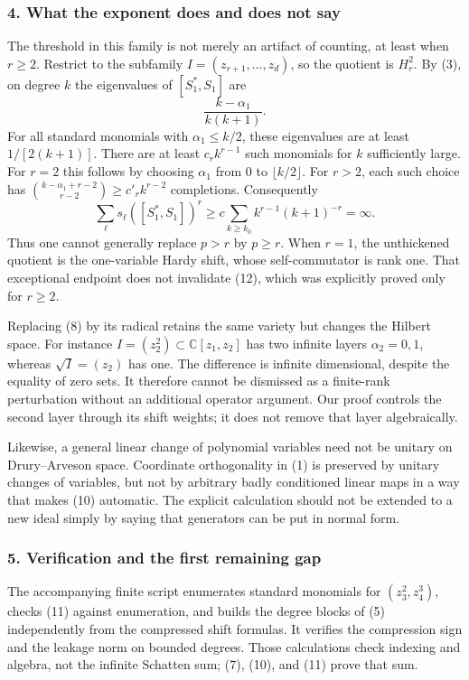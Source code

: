 \documentclass[11pt]{article}
\begin{document}
\subsubsection{4. What the exponent does and does not say}
The threshold in this family is not merely an artifact of counting, at least when $r\geq2$. Restrict to the subfamily $I=(z_{r+1},\ldots,z_d)$, so the quotient is $H_r^2$. By (3), on degree $k$ the eigenvalues of $[S_1^*,S_1]$ are
\[
 \frac{k-\alpha_1}{k(k+1)}.
\]
For all standard monomials with $\alpha_1\leq k/2$, these eigenvalues are at least $1/[2(k+1)]$. There are at least $c_r k^{r-1}$ such monomials for $k$ sufficiently large. For $r=2$ this follows by choosing $\alpha_1$ from $0$ to $\lfloor k/2\rfloor$. For $r>2$, each such choice has
${k-\alpha_1+r-2\choose r-2}\geq c'_r k^{r-2}$ completions. Consequently
\[
 \sum_\ell s_\ell([S_1^*,S_1])^r
 \geq c\sum_{k\geq k_0} k^{r-1}(k+1)^{-r}=\infty.         \tag{12}
\]
Thus one cannot generally replace $p>r$ by $p\geq r$. When $r=1$, the unthickened quotient is the one-variable Hardy shift, whose self-commutator is rank one. That exceptional endpoint does not invalidate (12), which was explicitly proved only for $r\geq2$.

Replacing (8) by its radical retains the same variety but changes the Hilbert space. For instance $I=(z_2^2)\subset\mathbb C[z_1,z_2]$ has two infinite layers $\alpha_2=0,1$, whereas $\sqrt I=(z_2)$ has one. The difference is infinite dimensional, despite the equality of zero sets. It therefore cannot be dismissed as a finite-rank perturbation without an additional operator argument. Our proof controls the second layer through its shift weights; it does not remove that layer algebraically.

Likewise, a general linear change of polynomial variables need not be unitary on Drury--Arveson space. Coordinate orthogonality in (1) is preserved by unitary changes of variables, but not by arbitrary badly conditioned linear maps in a way that makes (10) automatic. The explicit calculation should not be extended to a new ideal simply by saying that generators can be put in normal form.

\subsubsection{5. Verification and the first remaining gap}
The accompanying finite script enumerates standard monomials for $(z_3^2,z_4^3)$, checks (11) against enumeration, and builds the degree blocks of (5) independently from the compressed shift formulas. It verifies the compression sign and the leakage norm on bounded degrees. Those calculations check indexing and algebra, not the infinite Schatten sum; (7), (10), and (11) prove that sum.
\end{document}
